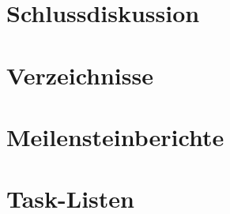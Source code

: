\documentclass[a4paper]{report}
\begin{document}
\chapter{Schlussdiskussion}

\chapter*{Verzeichnisse}

\listoffigures

\listoftables

\printbibliography

\appendix

\chapter{Meilensteinberichte}

\chapter{Task-Listen}
\end{document}

